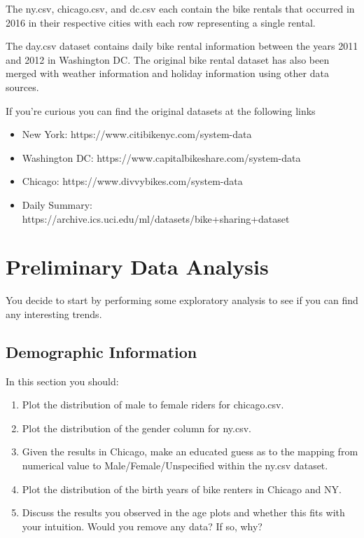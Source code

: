 \documentclass[12pt, answers, addpoints]{exam}
\begin{document}
The ny.csv, chicago.csv, and dc.csv each contain the bike rentals that occurred in 2016 in their respective cities with each row representing a single rental.

The day.csv dataset contains daily bike rental information between the years 2011 and 2012 in Washington DC. The original bike rental dataset has also been merged with weather information and holiday information using other data sources.

If you're curious you can find the original datasets at the following links
\begin{itemize}
    \item New York: https://www.citibikenyc.com/system-data
    \item Washington DC: https://www.capitalbikeshare.com/system-data
    \item Chicago: https://www.divvybikes.com/system-data
    \item Daily Summary: https://archive.ics.uci.edu/ml/datasets/bike+sharing+dataset
\end{itemize}

\section{Preliminary Data Analysis}
You decide to start by performing some exploratory analysis to see if you can find any interesting trends.

\subsection{Demographic Information}
In this section you should:
\begin{enumerate}
    \item Plot the distribution of male to female riders for chicago.csv.
    \item Plot the distribution of the gender column for ny.csv.
    \item Given the results in Chicago, make an educated guess as to the mapping from numerical value to Male/Female/Unspecified within the ny.csv dataset.
    \item Plot the distribution of the birth years of bike renters in Chicago and NY.
    \item Discuss the results you observed in the age plots and whether this fits with your intuition. Would you remove any data? If so, why?
\end{enumerate}
\end{document}
